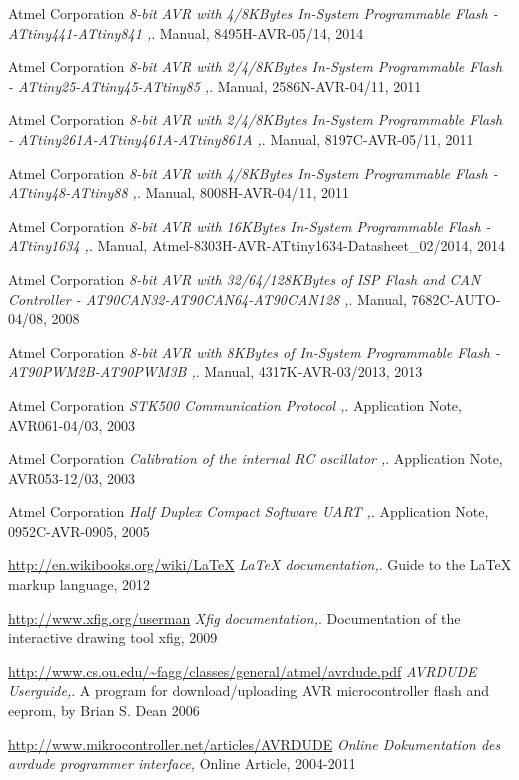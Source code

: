 \documentclass[pdftex,12pt,a4paper,oneside,english]{report}
\begin{document}
\begin{thebibliography}{99}
Atmel Corporation
\emph{8-bit AVR with 4/8KBytes In-System Programmable Flash - ATtiny441-ATtiny841 ,}.
Manual,
8495H-AVR-05/14,
2014

Atmel Corporation
\emph{8-bit AVR with 2/4/8KBytes In-System Programmable Flash - ATtiny25-ATtiny45-ATtiny85 ,}.
Manual,
2586N-AVR-04/11,
2011

Atmel Corporation
\emph{8-bit AVR with 2/4/8KBytes In-System Programmable Flash - ATtiny261A-ATtiny461A-ATtiny861A ,}.
Manual,
8197C-AVR-05/11,
2011

Atmel Corporation
\emph{8-bit AVR with 4/8KBytes In-System Programmable Flash - ATtiny48-ATtiny88 ,}.
Manual,
8008H-AVR-04/11,
2011

Atmel Corporation
\emph{8-bit AVR with 16KBytes In-System Programmable Flash - ATtiny1634 ,}.
Manual,
Atmel-8303H-AVR-ATtiny1634-Datasheet\_02/2014,
2014

Atmel Corporation
\emph{8-bit AVR with 32/64/128KBytes of ISP Flash and CAN Controller - AT90CAN32-AT90CAN64-AT90CAN128 ,}.
Manual,
7682C-AUTO-04/08,
2008

Atmel Corporation
\emph{8-bit AVR with 8KBytes of In-System Programmable Flash - AT90PWM2B-AT90PWM3B ,}.
Manual,
4317K-AVR-03/2013,
2013

Atmel Corporation
\emph{STK500 Communication Protocol ,}.
Application Note,
AVR061-04/03,
2003

Atmel Corporation
\emph{Calibration of the internal RC oscillator ,}.
Application Note,
AVR053-12/03,
2003

Atmel Corporation
\emph{Half Duplex Compact Software UART ,}.
Application Note,
0952C-AVR-0905,
2005

\url{http://en.wikibooks.org/wiki/LaTeX}
\emph{LaTeX documentation,}.
Guide to the LaTeX markup language,
2012

\url{http://www.xfig.org/userman}
\emph{Xfig documentation,}.
Documentation of the interactive drawing tool xfig,
2009

\url{http://www.cs.ou.edu/~fagg/classes/general/atmel/avrdude.pdf}
\emph{AVRDUDE Userguide,}.
A program for download/uploading AVR microcontroller flash and eeprom,
by Brian S. Dean
2006

\url{http://www.mikrocontroller.net/articles/AVRDUDE}
\emph{Online Dokumentation des avrdude programmer interface,}
Online Article,
2004-2011


\end{thebibliography}
\end{document}
